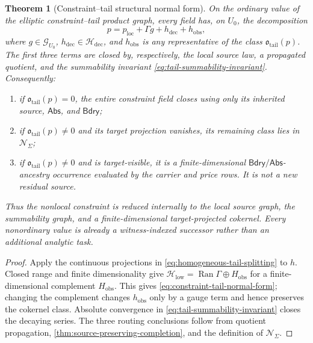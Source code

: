 \documentclass[11pt]{article}
\numberwithin{section}{part}
\theoremstyle{plain}
\newtheorem{theorem}{Theorem}[section]
\theoremstyle{definition}
\theoremstyle{remark}
\newcommand{\Abs}{\mathsf{Abs}}
\newcommand{\Bdry}{\mathsf{Bdry}}
\newcommand{\Null}{\mathscr N}
\newcommand{\Ran}{\operatorname{Ran}}
\begin{document}
\begin{theorem}[Constraint--tail structural normal form]
\label{thm:constraint-tail-normal-form}
On the ordinary value of the elliptic constraint--tail product graph, every
field has, on \(U_0\), the
decomposition
\begin{equation}
 \label{eq:constraint-tail-normal-form}
 p=p_{\mathrm{loc}}+\Gamma g+h_{\mathrm{dec}}+h_{\mathrm{obs}},
\end{equation}
where \(g\in\mathcal G_{U_0}\),
\(h_{\mathrm{dec}}\in\mathcal H_{\mathrm{dec}}\), and
\(h_{\mathrm{obs}}\) is any representative of the class
\(\mathfrak o_{\mathrm{tail}}(p)\).  The first three terms are closed by,
respectively, the local source law, a propagated quotient, and the
summability invariant \eqref{eq:tail-summability-invariant}.  Consequently:
\begin{enumerate}[label=\textup{(C\arabic*)}]
\item if \(\mathfrak o_{\mathrm{tail}}(p)=0\), the entire constraint field
  closes using only its inherited source, \(\Abs\), and \(\Bdry\);
\item if \(\mathfrak o_{\mathrm{tail}}(p)\ne0\) and its target projection
  vanishes, its remaining class lies in \(\Null_\Sigma\);
\item if \(\mathfrak o_{\mathrm{tail}}(p)\ne0\) and is target-visible, it is
  a finite-dimensional \(\Bdry/\Abs\)-ancestry occurrence evaluated by the
  carrier and price rows.  It is not a new residual source.
\end{enumerate}
Thus the nonlocal constraint is reduced internally to the local source graph,
the summability graph, and a finite-dimensional target-projected cokernel.
Every nonordinary value is already a witness-indexed successor rather than an
additional analytic task.
\end{theorem}

\begin{proof}
Apply the continuous projections in
\eqref{eq:homogeneous-tail-splitting} to \(h\).  Closed range and finite
dimensionality give
\(
 \mathcal H_{\mathrm{low}}
 =\Ran\Gamma\oplus H_{\mathrm{obs}}
\)
for a finite-dimensional complement \(H_{\mathrm{obs}}\).  This gives
\eqref{eq:constraint-tail-normal-form}; changing the complement changes
\(h_{\mathrm{obs}}\) only by a gauge term and hence preserves the cokernel
class.  Absolute convergence in
\eqref{eq:tail-summability-invariant} closes the decaying series.  The three
routing conclusions follow from quotient propagation,
\cref{thm:source-preserving-completion}, and the definition of
\(\Null_\Sigma\).
\end{proof}
\end{document}
